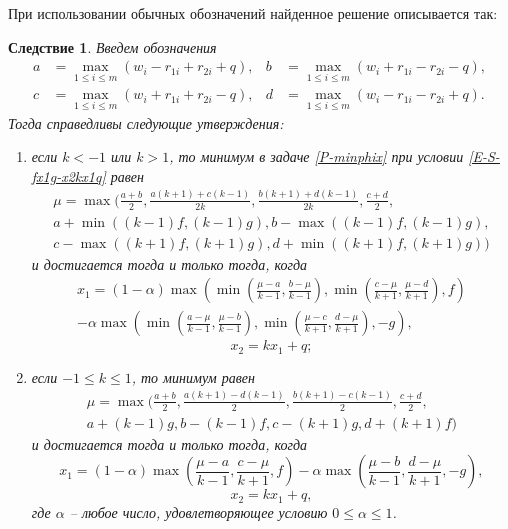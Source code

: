 \documentclass{spisok-article}
\newtheorem{corollary}{Следствие}
\begin{document}
При использовании обычных обозначений найденное решение описывается так:
\begin{corollary}
	Введем обозначения
	\begin{align*}
	a
	&=
	\max_{1\leq i \leq m}(w_{i}-r_{1i}+r_{2i}+q),
	&
	b
	&=
	\max_{1\leq i \leq m}(w_{i}+r_{1i}-r_{2i}-q),
	\\
	c
	&=
	\max_{1\leq i \leq m}(w_{i}+r_{1i}+r_{2i}-q),
	&
	d
	&=
	\max_{1\leq i \leq m}(w_{i}-r_{1i}-r_{2i}+q).
	\end{align*}
	Тогда справедливы следующие утверждения:
	\begin{enumerate}\renewcommand\labelenumi{\textup{\theenumi)}}
		\item
		если $k<-1$ или $k>1$, то минимум в задаче \eqref{P-minphix} при условии \eqref{E-S-fx1g-x2kx1q} равен
	\begin{multline*}
	\mu
	=
	\max\bigg(\frac{a+b}{2},\frac{a(k+1)+c(k-1)}{2k},\frac{b(k+1)+d(k-1)}{2k},\frac{c+d}{2},
	\\
	a+\min((k-1)f,(k-1)g),b-\max((k-1)f,(k-1)g),
	\\
	c-\max((k+1)f,(k+1)g) ,d+\min((k+1)f,(k+1)g)\bigg)
	\end{multline*}
	и достигается тогда и только тогда, когда
	\begin{multline*}
	x_{1}
	=
	(1-\alpha)\max\left(\min\left(\frac{\mu-a}{k-1},\frac{b-\mu}{k-1}\right),\min\left(\frac{c-\mu}{k+1},\frac{\mu-d}{k+1}\right),f\right)
	\\
	-\alpha\max\left(\min\left(\frac{a-\mu}{k-1},\frac{\mu-b}{k-1}\right),\min\left(\frac{\mu-c}{k+1},\frac{d-\mu}{k+1}\right),-g\right),
	\end{multline*}
    \begin{equation*}
	x_{2}
	=
	kx_{1}+q;
	\end{equation*}
	\item
		если $-1\leq k\leq 1$, то минимум равен
	\begin{multline*}
	\mu
	=
	\max\bigg(\frac{a+b}{2},
	\frac{a(k+1)-d(k-1)}{2},
	\frac{b(k+1)-c(k-1)}{2},
	\frac{c+d}{2},
	\\
	a+(k-1)g,
	b-(k-1)f,
	c-(k+1)g,
	d+(k+1)f\bigg)
	\end{multline*}
	и достигается тогда и только тогда, когда
	\begin{equation*}
	x_{1}
	=
	(1-\alpha)\max\left(\frac{\mu-a}{k-1},\frac{c-\mu}{k+1},f\right)
	-
	\alpha\max\left(\frac{\mu-b}{k-1},\frac{d-\mu}{k+1},-g\right),
	\end{equation*}
	\begin{equation*}
	x_{2}
	=
	kx_{1}+q,
	\end{equation*}
		где $\alpha$ -- любое число, удовлетворяющее условию $0\leq\alpha\leq1$.
	\end{enumerate}
\end{corollary}
\end{document}
